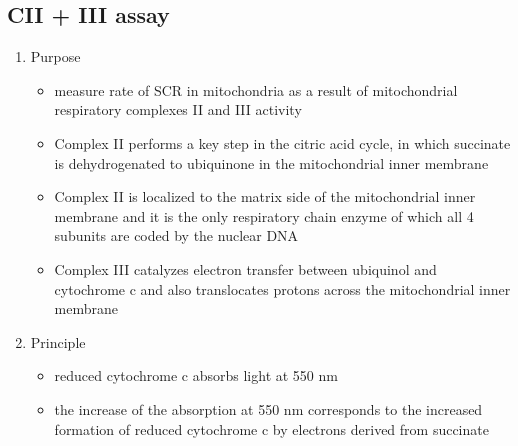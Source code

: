 \documentclass{scrartcl}
\begin{document}
\subsection{CII + III assay}
\label{sec:org41d1ea4}
\begin{enumerate}
\item Purpose
\label{sec:orgfec4fd0}
\begin{itemize}
\item measure rate of SCR in mitochondria as a result of mitochondrial
respiratory complexes II and III activity
\item Complex II performs a key step in the citric acid cycle, in which
succinate is dehydrogenated to ubiquinone in the mitochondrial inner
membrane
\item Complex II is localized to the matrix side of the mitochondrial
inner membrane and it is the only respiratory chain enzyme of which
all 4 subunits are coded by the nuclear DNA
\item Complex III catalyzes electron transfer between ubiquinol and
cytochrome c and also translocates protons across the mitochondrial
inner membrane
\end{itemize}

\item Principle
\label{sec:orgbd75dae}
\begin{itemize}
\item reduced cytochrome c absorbs light at 550 nm
\item the increase of the absorption at 550 nm corresponds to the
increased formation of reduced cytochrome c by electrons derived
from succinate
\end{itemize}

{\tiny{}}
\\
\end{enumerate}
\end{document}
